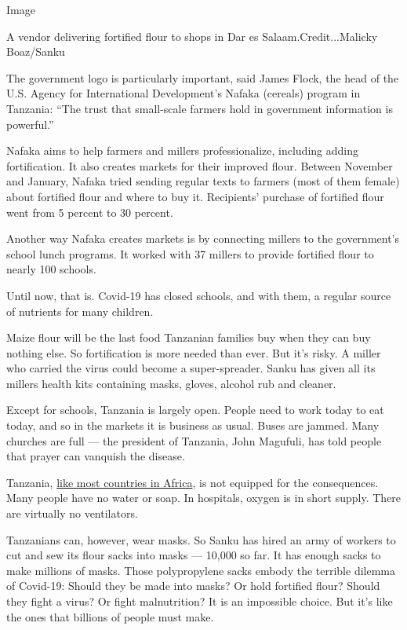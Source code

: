 Image

A vendor delivering fortified flour to shops in Dar es
Salaam.Credit...Malicky Boaz/Sanku

The government logo is particularly important, said James Flock, the
head of the U.S. Agency for International Development's Nafaka (cereals)
program in Tanzania: ``The trust that small-scale farmers hold in
government information is powerful.''

Nafaka aims to help farmers and millers professionalize, including
adding fortification. It also creates markets for their improved flour.
Between November and January, Nafaka tried sending regular texts to
farmers (most of them female) about fortified flour and where to buy it.
Recipients' purchase of fortified flour went from 5 percent to 30
percent.

Another way Nafaka creates markets is by connecting millers to the
government's school lunch programs. It worked with 37 millers to provide
fortified flour to nearly 100 schools.

Until now, that is. Covid-19 has closed schools, and with them, a
regular source of nutrients for many children.

Maize flour will be the last food Tanzanian families buy when they can
buy nothing else. So fortification is more needed than ever. But it's
risky. A miller who carried the virus could become a super-spreader.
Sanku has given all its millers health kits containing masks, gloves,
alcohol rub and cleaner.

Except for schools, Tanzania is largely open. People need to work today
to eat today, and so in the markets it is business as usual. Buses are
jammed. Many churches are full --- the president of Tanzania, John
Magufuli, has told people that prayer can vanquish the disease.

Tanzania,
\href{https://www.nytimes3xbfgragh.onion/2020/04/18/world/africa/africa-coronavirus-ventilators.html}{like
most countries in Africa}, is not equipped for the consequences. Many
people have no water or soap. In hospitals, oxygen is in short supply.
There are virtually no ventilators.

Tanzanians can, however, wear masks. So Sanku has hired an army of
workers to cut and sew its flour sacks into masks --- 10,000 so far. It
has enough sacks to make millions of masks. Those polypropylene sacks
embody the terrible dilemma of Covid-19: Should they be made into masks?
Or hold fortified flour? Should they fight a virus? Or fight
malnutrition? It is an impossible choice. But it's like the ones that
billions of people must make.

